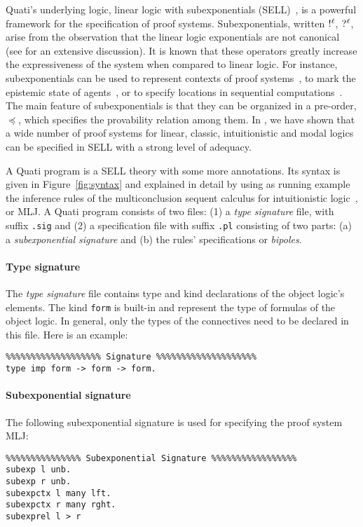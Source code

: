\documentclass{llncs}
\newcommand{\nbang}[1]{\hbox{$!^{#1}$}}
\newcommand{\nquest}[1]{\hbox{$?^{#1}$}}
\begin{document}
Quati's underlying logic, linear logic with subexponentials
(SELL)~\cite{nigam09ppdp}, is a powerful framework for the specification of proof systems. 
Subexponentials, written $\nbang{\ell}$, $\nquest{\ell}$, arise from the
observation that the linear logic exponentials are not canonical (see
\cite{nigam.jlc} for an extensive discussion). It is known that these operators
greatly increase
the expressiveness of the system when compared to linear logic. For instance,
subexponentials can be used to represent contexts of proof
systems~\cite{nigam.jlc}, to mark the epistemic state of
agents~\cite{nigam12lics}, or to specify locations in sequential
computations~\cite{nigam09ppdp}. 
The main feature of subexponentials is that they can be organized in a pre-order, $\preceq$, which specifies
the provability relation among them. 
In \cite{nigam.jlc}, we have shown that a wide number of proof systems for linear, classic, intuitionistic and 
modal logics can be specified in SELL with a strong level of adequacy. 

A Quati program is a SELL theory with some more annotations. Its syntax is given
in Figure~\ref{fig:syntax} and explained in detail  
by using as running example the inference rules of the multiconclusion sequent
calculus for intuitionistic logic~\cite{maehara}, or MLJ.
A Quati program consists of two files: (1) a \emph{type signature} file, with
suffix \texttt{.sig} and (2) a specification file with suffix \texttt{.pl} consisting of two parts: (a) a
\emph{subexponential signature} and (b) the rules' specifications or
\emph{bipoles}.

\paragraph{Type signature}
%
The \emph{type signature} file contains type and kind declarations of the object
logic's elements. The kind \texttt{form} is built-in and
represent the type of formulas of the object logic. In general, only
the types of the connectives need to be declared in this file. Here is an
example:
%
{\scriptsize
\begin{verbatim}
%%%%%%%%%%%%%%%%%%% Signature %%%%%%%%%%%%%%%%%%%%
type imp form -> form -> form.
\end{verbatim}
}

\paragraph{Subexponential signature}
%
The following subexponential signature is used for specifying the proof system MLJ:
%
{\scriptsize
\begin{verbatim}
%%%%%%%%%%%%%%% Subexponential Signature %%%%%%%%%%%%%%%%%
subexp l unb.            
subexp r unb.            
subexpctx l many lft.    
subexpctx r many rght.
subexprel l > r
\end{verbatim}
}
\end{document}

